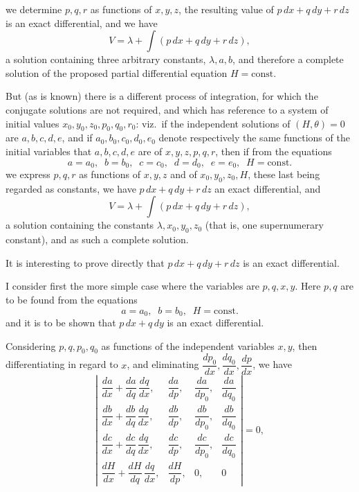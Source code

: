 \documentclass[11pt,a4paper]{article}
\begin{document}
\newpage


we determine $p, q, r$ as functions of $x, y, z$, the resulting value of $p\,dx + q\,dy + r\,dz$ is an exact differential, and we have
\[
V = \lambda + \int (p\,dx + q\,dy + r\,dz),
\]
a solution containing three arbitrary constants, $\lambda, a, b$, and therefore a complete solution of the proposed partial differential equation $H = \text{const.}$

But (as is known) there is a different process of integration, for which the conjugate solutions are not required, and which has reference to a system of initial values $x_{0}, y_{0}, z_{0}, p_{0}, q_{0}, r_{0}$: viz.\ if the independent solutions of $(H, \theta) = 0$ are $a, b, c, d, e$, and if $a_{0}, b_{0}, c_{0}, d_{0}, e_{0}$ denote respectively the same functions of the initial variables that $a, b, c, d, e$ are of $x, y, z, p, q, r$, then if from the equations
\[
a = a_{0}, \;\; b = b_{0}, \;\; c = c_{0}, \;\; d = d_{0}, \;\; e = e_{0}, \;\; H = \text{const.}
\]
we express $p, q, r$ as functions of $x, y, z$ and of $x_{0}, y_{0}, z_{0}, H$, these last being regarded as constants, we have $p\,dx + q\,dy + r\,dz$ an exact differential, and
\[
V = \lambda + \int (p\,dx + q\,dy + r\,dz),
\]
a solution containing the constants $\lambda, x_{0}, y_{0}, z_{0}$ (that is, one supernumerary constant), and as such a complete solution.

It is interesting to prove directly that $p\,dx + q\,dy + r\,dz$ is an exact differential.

I consider first the more simple case where the variables are $p, q, x, y$. Here $p, q$ are to be found from the equations
\[
a = a_{0}, \;\; b = b_{0}, \;\; H = \text{const.}
\]
and it is to be shown that $p\,dx + q\,dy$ is an exact differential.

Considering $p, q, p_{0}, q_{0}$ as functions of the independent variables $x, y$, then differentiating in regard to $x$, and eliminating $\dfrac{dp_{0}}{dx}, \dfrac{dq_{0}}{dx}, \dfrac{dp}{dx}$, we have
\[
\left|
\begin{array}{cccc}
\dfrac{da}{dx} + \dfrac{da}{dq}\,\dfrac{dq}{dx}, & \dfrac{da}{dp}, & \dfrac{da}{dp_{0}}, & \dfrac{da}{dq_{0}} \\[6pt]
\dfrac{db}{dx} + \dfrac{db}{dq}\,\dfrac{dq}{dx}, & \dfrac{db}{dp}, & \dfrac{db}{dp_{0}}, & \dfrac{db}{dq_{0}} \\[6pt]
\dfrac{dc}{dx} + \dfrac{dc}{dq}\,\dfrac{dq}{dx}, & \dfrac{dc}{dp}, & \dfrac{dc}{dp_{0}}, & \dfrac{dc}{dq_{0}} \\[6pt]
\dfrac{dH}{dx} + \dfrac{dH}{dq}\,\dfrac{dq}{dx}, & \dfrac{dH}{dp}, & 0, & 0
\end{array}
\right| = 0,
\]
\end{document}
